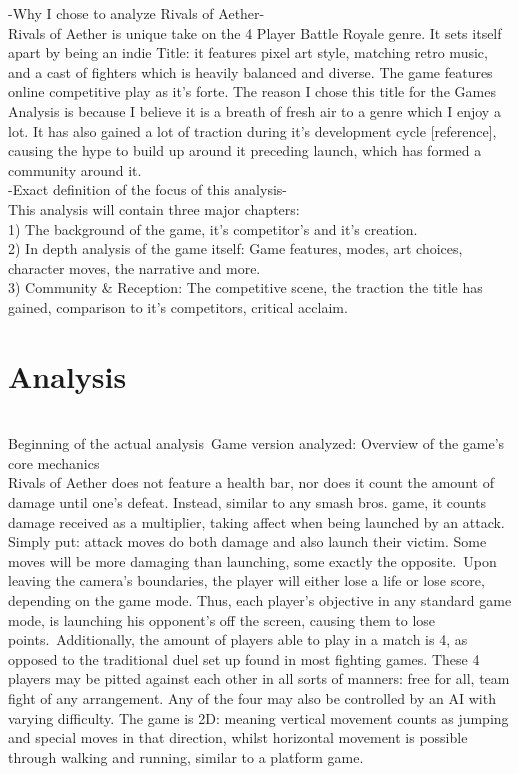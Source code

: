 \documentclass[11pt]{article}
\begin{document}
-Why I chose to analyze Rivals of Aether-\\
Rivals of Aether is unique take on the 4 Player Battle Royale genre. It sets itself apart by being an indie Title: it features pixel art style, matching retro music, and a cast of fighters which is heavily balanced and diverse. The game features online competitive play as it's forte. The reason I chose this title for the Games Analysis is because I believe it is a breath of fresh air to a genre which I enjoy a lot. It has also gained a lot of traction during it's development cycle [reference], causing the hype to build up around it preceding launch, which has formed a community around it.\\
-Exact definition of the focus of this analysis-\\
This analysis will contain three major chapters:\\
1) The background of the game, it's competitor's and it's creation.\\
2) In depth analysis of the game itself: Game features, modes, art choices, character moves, the narrative and more.\\
3) Community & Reception: The competitive scene, the traction the title has gained, comparison to it's competitors, critical acclaim.\\

\newpage
\chapter{Analysis}\\
Beginning of the actual analysis\
Game version analyzed: %
Overview of the game's core mechanics\\
Rivals of Aether does not feature a health bar, nor does it count the amount of damage until one's defeat. Instead, similar to any smash bros. game, it counts damage received as a multiplier, taking affect when being launched by an attack. Simply put: attack moves do both damage and also launch their victim. Some moves will be more damaging than launching, some exactly the opposite.\
Upon leaving the camera's boundaries, the player will either lose a life or lose score, depending on the game mode. Thus, each player's objective in any standard game mode, is launching his opponent's off the screen, causing them to lose points.\
 Additionally, the amount of players able to play in a match is 4, as opposed to the traditional duel set up found in most fighting games. These 4 players may be pitted against each other in all sorts of manners: free for all, team fight of any arrangement. Any of the four may also be controlled by an AI with varying difficulty. The game is 2D: meaning vertical movement counts as jumping and special moves in that direction, whilst horizontal movement is possible through walking and running, similar to a platform game.\\ %
\end{document}
